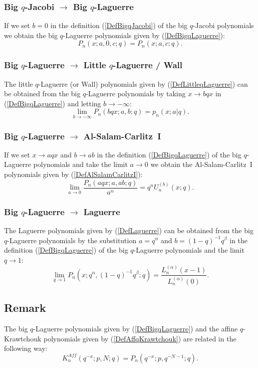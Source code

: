 \documentclass[envcountchap,graybox]{svmono}
\newcounter{rom}
\begin{document}
\subsubsection*{Big $q$-Jacobi $\rightarrow$ Big $q$-Laguerre}
If we set $b=0$ in the definition (\ref{DefBigqJacobi}) of
the big $q$-Jacobi polynomials we obtain the big $q$-Laguerre
polynomials given by (\ref{DefBigqLaguerre}):
$$P_n(x;a,0,c;q)=P_n(x;a,c;q).$$

\subsubsection*{Big $q$-Laguerre $\rightarrow$ Little $q$-Laguerre / Wall}
The little $q$-Laguerre (or Wall) polynomials given by (\ref{DefLittleqLaguerre})
can be obtained from the big $q$-Laguerre polynomials by taking $x\rightarrow bqx$
in (\ref{DefBigqLaguerre}) and letting $b\rightarrow -\infty$:
\begin{equation}
\lim_{b\rightarrow -\infty}P_n(bqx;a,b;q)=p_n(x;a|q).
\end{equation}

\subsubsection*{Big $q$-Laguerre $\rightarrow$ Al-Salam-Carlitz~I}
If we set $x\rightarrow aqx$ and $b\rightarrow ab$ in the definition
(\ref{DefBigqLaguerre}) of the big $q$-Laguerre polynomials and take the
limit $a\rightarrow 0$ we obtain the Al-Salam-Carlitz~I polynomials given by
(\ref{DefAlSalamCarlitzI}):
\begin{equation}
\lim_{a\rightarrow 0}\frac{P_n(aqx;a,ab;q)}{a^n}=q^nU_n^{(b)}(x;q).
\end{equation}

\subsubsection*{Big $q$-Laguerre $\rightarrow$ Laguerre}
The Laguerre polynomials given by (\ref{DefLaguerre}) can be obtained
from the big $q$-Laguerre polynomials by the substitution $a=q^{\alpha}$ and
$b=(1-q)^{-1}q^{\beta}$ in the definition (\ref{DefBigqLaguerre}) of the big
$q$-Laguerre polynomials and the limit $q\rightarrow 1$:
\begin{equation}
\lim_{q\rightarrow 1}P_n(x;q^{\alpha},(1-q)^{-1}q^{\beta};q)=
\frac{L_n^{(\alpha)}(x-1)}{L_n^{(\alpha)}(0)}.
\end{equation}

\subsection*{Remark}
The big $q$-Laguerre polynomials given by (\ref{DefBigqLaguerre}) and the
affine $q$-Krawtchouk polynomials given by (\ref{DefAffqKrawtchouk}) are
related in the following way:
$$K_n^{Aff}(q^{-x};p,N;q)=P_n(q^{-x};p,q^{-N-1};q).$$
\end{document}
